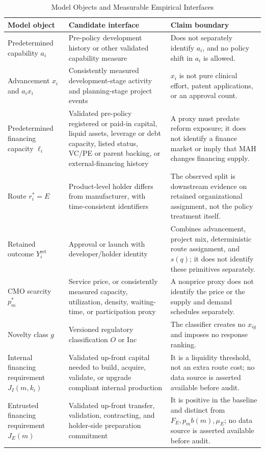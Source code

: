 \documentclass[12pt]{article}
\newcommand{\1}{\mathbf{1}}
\begin{document}
\begin{table}[htbp]
\centering
\footnotesize
\caption{Model Objects and Measurable Empirical Interfaces}
\label{tab:model_data_mapping}
\begin{tabularx}{\textwidth}{L{0.24\textwidth}Y Y}
\toprule
Model object & Candidate interface & Claim boundary \\
\midrule
Predetermined capability \(a_i\) & Pre-policy development history or other validated capability measure & Does not separately identify \(a_i\), and no policy shift in \(a_i\) is allowed. \\
Advancement \(x_i\) and \(a_ix_i\) & Consistently measured development-stage activity and planning-stage project events & \(x_i\) is not pure clinical effort, patent applications, or an approval count. \\
Predetermined financing capacity \(\ell_i\) & Validated pre-policy registered or paid-in capital, liquid assets, leverage or debt capacity, listed status, VC/PE or parent backing, or external-financing history & A proxy must predate reform exposure; it does not identify a finance market or imply that MAH changes financing supply. \\
Route \(r_i^*=E\) & Product-level holder differs from manufacturer, with time-consistent identifiers & The observed split is downstream evidence on retained organizational assignment, not the policy treatment itself. \\
Retained outcome \(Y_i^{\mathrm{ret}}\) & Approval or launch with developer/holder identity & Combines advancement, project mix, deterministic route assignment, and \(s(q)\); it does not identify these primitives separately. \\
CMO scarcity \(p_m^*\) & Service price, or consistently measured capacity, utilization, density, waiting-time, or participation proxy & A nonprice proxy does not identify the price or the supply and demand schedules separately. \\
Novelty class \(g\) & Versioned regulatory classification \(O\) or \(\mathrm{Inc}\) & The classifier creates no \(x_{ig}\) and imposes no response ranking. \\
Internal financing requirement \(J_I(m,k_i)\) & Validated up-front capital needed to build, acquire, validate, or upgrade compliant internal production & It is a liquidity threshold, not an extra route cost; no data source is asserted available before audit. \\
Entrusted financing requirement \(J_E(m)\) & Validated up-front transfer, validation, contracting, and holder-side preparation commitment & It is positive in the baseline and distinct from \(F_E,p_mb(m),\mu_E\); no data source is asserted available before audit. \\
\bottomrule
\end{tabularx}
\end{table}
\end{document}
